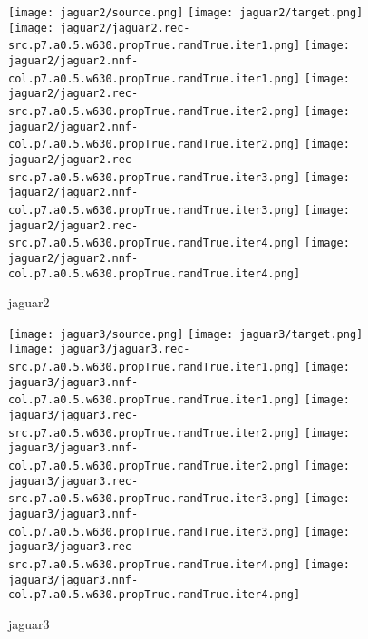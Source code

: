 \documentclass{article}
\begin{document}
\begin{figure}[H]
\centering
\texttt{[image: jaguar2/source.png]}\enskip
\texttt{[image: jaguar2/target.png]}
\texttt{[image: jaguar2/jaguar2.rec-src.p7.a0.5.w630.propTrue.randTrue.iter1.png]}\enskip
\texttt{[image: jaguar2/jaguar2.nnf-col.p7.a0.5.w630.propTrue.randTrue.iter1.png]}
\texttt{[image: jaguar2/jaguar2.rec-src.p7.a0.5.w630.propTrue.randTrue.iter2.png]}\enskip
\texttt{[image: jaguar2/jaguar2.nnf-col.p7.a0.5.w630.propTrue.randTrue.iter2.png]}
\texttt{[image: jaguar2/jaguar2.rec-src.p7.a0.5.w630.propTrue.randTrue.iter3.png]}\enskip
\texttt{[image: jaguar2/jaguar2.nnf-col.p7.a0.5.w630.propTrue.randTrue.iter3.png]}
\texttt{[image: jaguar2/jaguar2.rec-src.p7.a0.5.w630.propTrue.randTrue.iter4.png]}\enskip
\texttt{[image: jaguar2/jaguar2.nnf-col.p7.a0.5.w630.propTrue.randTrue.iter4.png]}
\caption{jaguar2}
\end{figure}

\begin{figure}[H]
\centering
\texttt{[image: jaguar3/source.png]}\enskip
\texttt{[image: jaguar3/target.png]}
\texttt{[image: jaguar3/jaguar3.rec-src.p7.a0.5.w630.propTrue.randTrue.iter1.png]}\enskip
\texttt{[image: jaguar3/jaguar3.nnf-col.p7.a0.5.w630.propTrue.randTrue.iter1.png]}
\texttt{[image: jaguar3/jaguar3.rec-src.p7.a0.5.w630.propTrue.randTrue.iter2.png]}\enskip
\texttt{[image: jaguar3/jaguar3.nnf-col.p7.a0.5.w630.propTrue.randTrue.iter2.png]}
\texttt{[image: jaguar3/jaguar3.rec-src.p7.a0.5.w630.propTrue.randTrue.iter3.png]}\enskip
\texttt{[image: jaguar3/jaguar3.nnf-col.p7.a0.5.w630.propTrue.randTrue.iter3.png]}
\texttt{[image: jaguar3/jaguar3.rec-src.p7.a0.5.w630.propTrue.randTrue.iter4.png]}\enskip
\texttt{[image: jaguar3/jaguar3.nnf-col.p7.a0.5.w630.propTrue.randTrue.iter4.png]}
\caption{jaguar3}
\end{figure}
\end{document}
